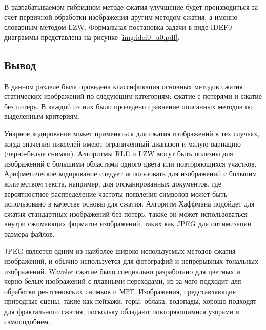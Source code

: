 В разрабатываемом гибридном методе сжатия улучшение будет производиться за счет первичной обработки изображения другим методом сжатия, а именно словарным методом LZW. Формальная постановка задачи в виде IDEF0-диаграммы представлена на рисунке \ref{img:idef0_a0.pdf}.

\subsection*{Вывод}

В данном разделе была проведена классификация основных методов сжатия статических изображений по следующим категориям: сжатие с потерями и сжатие без потерь. В каждой из них было проведено сравнение описанных методов по выделенным критериям.

Унарное кодирование может применяться для сжатия изображений в тех случаях, когда значения пикселей имеют ограниченный диапазон и малую вариацию (черно-белые снимки). Алгоритмы RLE и LZW могут быть полезны для изображений с большими областями одного цвета или повторяющихся участков. Арифметическое кодирование следует использовать для изображений с большим количеством текста, например, для отсканированных документов, где вероятностное распределение частоты появления символов может быть использовано в качестве основы для сжатия. Алгоритм Хаффмана подойдет для сжатия стандартных изображений без потерь, также он может использоваться внутри сжимающих форматов изображений, таких как JPEG для оптимизации размера файлов.

JPEG является одним из наиболее широко используемых методов сжатия изображений, и обычно используется для фотографий и непрерывных тональных изображений. Wavelet сжатие было специально разработано для цветных и черно-белых изображений с плавными переходами, из-за чего подходит для обработки рентгеновских снимков и МРТ. Изображения, представляющие природные сцены, такие как пейзажи, горы, облака, водопады, хорошо подходят для фрактального сжатия, поскольку обладают повторяющимися узорами и самоподобием.
